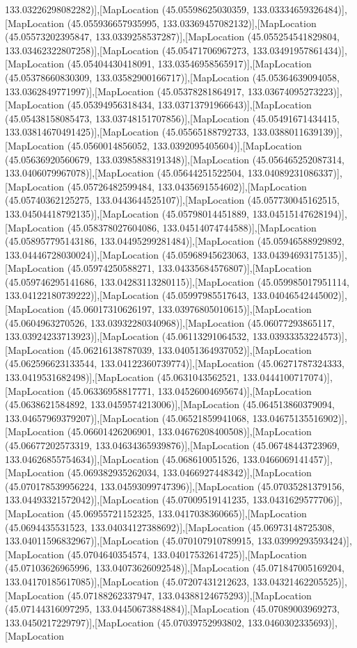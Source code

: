 133.03226298082282)],[MapLocation (45.05598625030359, 133.03334659326484)],[MapLocation (45.055936657935995, 133.03369457082132)],[MapLocation (45.05573202395847, 133.0339258537287)],[MapLocation (45.055254541829804, 133.03462322807258)],[MapLocation (45.05471706967273, 133.03491957861434)],[MapLocation (45.05404430418091, 133.03546958565917)],[MapLocation (45.05378660830309, 133.03582900166717)],[MapLocation (45.05364639094058, 133.0362849771997)],[MapLocation (45.05378281864917, 133.03674095273223)],[MapLocation (45.05394956318434, 133.03713791966643)],[MapLocation (45.05438158085473, 133.03748151707856)],[MapLocation (45.05491671434415, 133.03814670491425)],[MapLocation (45.05565188792733, 133.0388011639139)],[MapLocation (45.0560014856052, 133.0392095405604)],[MapLocation (45.05636920560679, 133.03985883191348)],[MapLocation (45.056465252087314, 133.0406079967078)],[MapLocation (45.05644251522504, 133.04089231086337)],[MapLocation (45.05726482599484, 133.0435691554602)],[MapLocation (45.05740362125275, 133.0443644525107)],[MapLocation (45.057730045162515, 133.04504418792135)],[MapLocation (45.05798014451889, 133.04515147628194)],[MapLocation (45.058378027604086, 133.04514074744588)],[MapLocation (45.058957795143186, 133.04495299281484)],[MapLocation (45.05946588929892, 133.04446728030024)],[MapLocation (45.05968945623063, 133.04394693175135)],[MapLocation (45.05974250588271, 133.04335684576807)],[MapLocation (45.059746295141686, 133.04283113280115)],[MapLocation (45.059985017951114, 133.04122180739222)],[MapLocation (45.05997985517643, 133.04046542445002)],[MapLocation (45.06017310626197, 133.03976805010615)],[MapLocation (45.0604963270526, 133.03932280340968)],[MapLocation (45.06077293865117, 133.03924233713923)],[MapLocation (45.06113291064532, 133.03933353224573)],[MapLocation (45.06216138787039, 133.04051364937052)],[MapLocation (45.062596623133544, 133.04122360739774)],[MapLocation (45.06271787324333, 133.0419531682498)],[MapLocation (45.0631043562521, 133.0444100717074)],[MapLocation (45.06336958817771, 133.04526004695674)],[MapLocation (45.0638621584892, 133.0459574213006)],[MapLocation (45.064513860379094, 133.04657969379207)],[MapLocation (45.06521859941068, 133.04675135516902)],[MapLocation (45.06601426206901, 133.04676208400508)],[MapLocation (45.06677202573319, 133.04634365939876)],[MapLocation (45.06748443723969, 133.04626855754634)],[MapLocation (45.068610051526, 133.0466069141457)],[MapLocation (45.069382935262034, 133.0466927448342)],[MapLocation (45.070178539956224, 133.04593099747396)],[MapLocation (45.07035281379156, 133.04493321572042)],[MapLocation (45.07009519141235, 133.0431629577706)],[MapLocation (45.06955721152325, 133.0417038360665)],[MapLocation (45.0694435531523, 133.04034127388692)],[MapLocation (45.06973148725308, 133.04011596832967)],[MapLocation (45.070107910789915, 133.03999293593424)],[MapLocation (45.0704640354574, 133.04017532614725)],[MapLocation (45.07103626965996, 133.04073626092548)],[MapLocation (45.071847005169204, 133.04170185617085)],[MapLocation (45.07207431212623, 133.04321462205525)],[MapLocation (45.07188262337947, 133.04388124675293)],[MapLocation (45.07144316097295, 133.04450673884884)],[MapLocation (45.07089003969273, 133.0450217229797)],[MapLocation (45.07039752993802, 133.0460302335693)],[MapLocation 